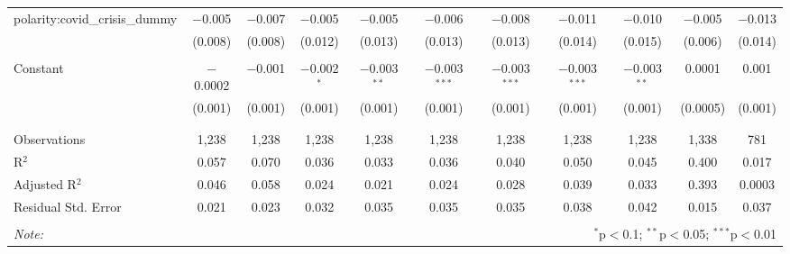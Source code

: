 \begin{table}[!htbp]
\begin{adjustbox}{width=1.25\textwidth}
\begin{tabular}{@{\extracolsep{5pt}}lcccccccccc}
 polarity:covid\_crisis\_dummy & $-$0.005 & $-$0.007 & $-$0.005 & $-$0.005 & $-$0.006 & $-$0.008 & $-$0.011 & $-$0.010 & $-$0.005 & $-$0.013 \\ 
  & (0.008) & (0.008) & (0.012) & (0.013) & (0.013) & (0.013) & (0.014) & (0.015) & (0.006) & (0.014) \\ 
  & & & & & & & & & & \\ 
 Constant & $-$0.0002 & $-$0.001 & $-$0.002$^{*}$ & $-$0.003$^{**}$ & $-$0.003$^{***}$ & $-$0.003$^{***}$ & $-$0.003$^{***}$ & $-$0.003$^{**}$ & 0.0001 & 0.001 \\ 
  & (0.001) & (0.001) & (0.001) & (0.001) & (0.001) & (0.001) & (0.001) & (0.001) & (0.0005) & (0.001) \\ 
  & & & & & & & & & & \\ 
\hline \\[-1.8ex] 
Observations & 1,238 & 1,238 & 1,238 & 1,238 & 1,238 & 1,238 & 1,238 & 1,238 & 1,338 & 781 \\ 
R$^{2}$ & 0.057 & 0.070 & 0.036 & 0.033 & 0.036 & 0.040 & 0.050 & 0.045 & 0.400 & 0.017 \\ 
Adjusted R$^{2}$ & 0.046 & 0.058 & 0.024 & 0.021 & 0.024 & 0.028 & 0.039 & 0.033 & 0.393 & 0.0003 \\ 
Residual Std. Error & 0.021 & 0.023 & 0.032 & 0.035 & 0.035 & 0.035 & 0.038 & 0.042 & 0.015 & 0.037 \\ 
\hline 
\hline \\[-1.8ex] 
\textit{Note:}  & \multicolumn{10}{r}{$^{*}$p$<$0.1; $^{**}$p$<$0.05; $^{***}$p$<$0.01} \\ 
\end{tabular} 
\end{adjustbox} 
\end{table} 

